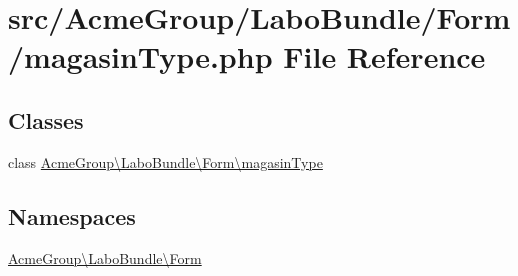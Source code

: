 \hypertarget{magasin_type_8php}{\section{src/\+Acme\+Group/\+Labo\+Bundle/\+Form/magasin\+Type.php File Reference}
\label{magasin_type_8php}
}
\subsection*{Classes}
\begin{DoxyCompactItemize}
\item 
class \hyperlink{class_acme_group_1_1_labo_bundle_1_1_form_1_1magasin_type}{Acme\+Group\textbackslash{}\+Labo\+Bundle\textbackslash{}\+Form\textbackslash{}magasin\+Type}
\end{DoxyCompactItemize}
\subsection*{Namespaces}
\begin{DoxyCompactItemize}
\item 
 \hyperlink{namespace_acme_group_1_1_labo_bundle_1_1_form}{Acme\+Group\textbackslash{}\+Labo\+Bundle\textbackslash{}\+Form}
\end{DoxyCompactItemize}
